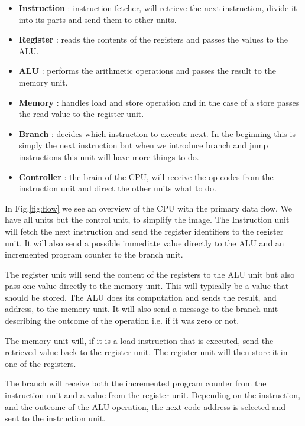 \documentclass[a4paper,11pt]{article}
\begin{document}
\begin{itemize}

\item {\bf Instruction} : instruction fetcher, will retrieve the next
  instruction, divide it into its parts and send them to other units.

\item {\bf Register} : reads the contents of the registers
  and passes the values to the ALU.

\item {\bf ALU} : performs the arithmetic operations and passes the
  result to the memory unit.

\item {\bf Memory} : handles load and store operation and in the case
  of a store passes the read value to the register unit.

\item {\bf Branch} : decides which instruction to
  execute next. In the beginning this is simply the next instruction
  but when we introduce branch and jump instructions this unit will
  have more things to do.

\item {\bf Controller} : the brain of the CPU, will receive the op
  codes from the instruction unit and direct the other units what to do.
  
\end{itemize}

In Fig.\ref{fig:flow} we see an overview of the CPU with the primary
data flow. We have all units but the control unit, to simplify the
image. The Instruction unit will fetch the next instruction and send the
register identifiers to the register unit. It will also send a
possible immediate value directly to the ALU and an incremented
program counter to the branch unit.

The register unit will send the content of the registers to the ALU
unit but also pass one value directly to the memory unit.  This will
typically be a value that should be stored. The ALU does its
computation and sends the result, and address, to the memory unit. It
will also send a message to the branch unit describing the outcome of
the operation i.e. if it was zero or not.

The memory unit will, if it is a load instruction that is executed,
send the retrieved value back to the register unit. The register unit
will then store it in one of the registers.

The branch will receive both the incremented program counter from
the instruction unit and a value from the register unit. Depending on the
instruction, and the outcome of the ALU operation, the next code
address is selected and sent to the instruction unit.
\end{document}
